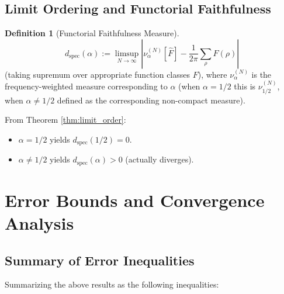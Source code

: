 \documentclass[12pt,a4paper]{amsart}
\theoremstyle{plain}
\theoremstyle{definition}
\newtheorem{definition}[theorem]{Definition}
\theoremstyle{remark}
\begin{document}
\subsection{Limit Ordering and Functorial Faithfulness}\label{sec:functorial}

\begin{definition}[Functorial Faithfulness Measure]\label{def:functorial}
\begin{equation}
d_{\mathrm{spec}}(\alpha) := \limsup_{N\to\infty} \left| \nu_\alpha^{(N)}[\widehat{F}] - \frac{1}{2\pi}\sum_{\rho}F(\rho) \right|
\end{equation}
(taking supremum over appropriate function classes $F$), where $\nu_\alpha^{(N)}$ is the frequency-weighted measure corresponding to $\alpha$ (when $\alpha=1/2$ this is $\nu_{1/2}^{(N)}$, when $\alpha\neq1/2$ defined as the corresponding non-compact measure).
\end{definition}

From Theorem \ref{thm:limit_order}:
\begin{itemize}
    \item $\alpha=1/2$ yields $d_{\mathrm{spec}}(1/2)=0$.
    \item $\alpha\neq1/2$ yields $d_{\mathrm{spec}}(\alpha) > 0$ (actually diverges).
\end{itemize}

\section{Error Bounds and Convergence Analysis}\label{sec:error}

\subsection{Summary of Error Inequalities}

Summarizing the above results as the following inequalities:
\end{document}
